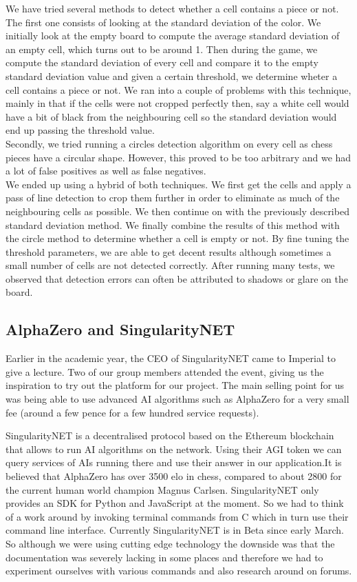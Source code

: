 \documentclass[11pt]{article}
\begin{document}
We have tried
several methods to detect whether a cell contains a piece or not. The first one
consists of looking at the standard deviation of the color. We initially look at
the empty board to compute the average standard deviation of an empty cell,
which turns out to be around 1. Then during the game, we compute the standard
deviation of every cell and compare it to the empty standard deviation value and
given a certain threshold, we determine wheter a cell contains a piece or not.
We ran into a couple of problems with this technique, mainly in that if the
cells were not cropped perfectly then, say a white cell would have a bit of
black from the neighbouring cell so the standard deviation would end up passing
the threshold value.\\

Secondly, we tried running a circles detection algorithm on every cell as chess
pieces have a circular shape. However, this proved to be too arbitrary and we
had a lot of false positives as well as false negatives.\\

We ended up using a hybrid of both techniques. We first get the cells and apply
a pass of line detection to crop them further in order to eliminate as much of
the neighbouring cells as possible. We then continue on with the previously
described standard deviation method. We finally combine the results of this
method with the circle method to determine whether a cell is empty or not. By
fine tuning the threshold parameters, we are able to get decent results although
sometimes a small number of cells are not detected correctly. After running many
tests, we observed that detection errors can often be attributed to shadows or
glare on the board.\\

\subsection{AlphaZero and SingularityNET}
Earlier in the academic year, the CEO of SingularityNET came to Imperial to give a lecture.
Two of our group members attended the event, giving us the inspiration to try out the platform
for our project. The main selling point for us was being able to use advanced AI algorithms
such as AlphaZero for a very small fee (around a few pence for a few hundred service requests).

SingularityNET is a decentralised protocol based on the Ethereum blockchain that
allows to run AI algorithms on the network. Using their AGI token we can query
services of AIs running there and use their answer in our application.It is
believed that AlphaZero has over 3500 elo in chess, compared to about 2800 for
the current human world champion Magnus Carlsen.
SingularityNET only provides an SDK for Python and JavaScript at the moment. So we had to think 
of a work around by invoking terminal commands from C which in turn use their command line
interface. 
Currently SingularityNET is in Beta since early March. So although we were using 
cutting edge technology the downside was that the documentation was severely 
lacking in some places and therefore we had to experiment ourselves with 
various commands and also research around on forums.
\end{document}
